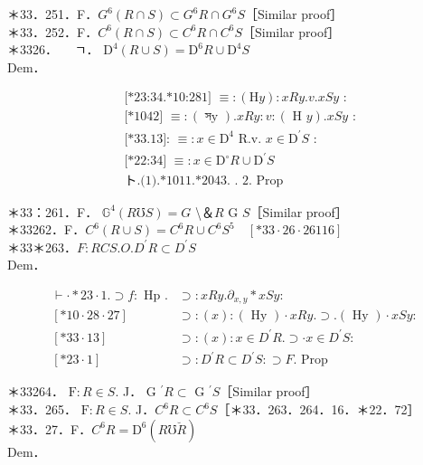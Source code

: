 \documentclass[10pt]{article}
\begin{document}
＊33．251．F．$G^{6}(R \cap S) \subset G^{6} R \cap G^{6} S$［Similar proof］\\
＊33．252．F．$C^{6}(R \cap S) \subset C^{6} R \cap C^{6} S$［Similar proof］\\
＊3326．$\quad$ ㄱ． $\mathrm{D}^{4}(R \cup S)=\mathrm{D}^{6} R \cup \mathrm{D}^{4} S$\\
Dem．


\begin{align*}
& \text { [*23:34.*10:281] } \equiv:(\mathrm{H} y): x R y . v . x S y \text { : } \\
& \text { [*1042] } \equiv:(\text { সy }) . x R y: v:(\text { H } y) . x S y \text { : } \\
& \text { [*33.13]: } \equiv: x \in \mathrm{D}^{4} \text { R.v. } x \in \mathrm{D}^{\prime} S \text { : } \\
& \text { [*22:34] } \equiv: x \in \mathrm{D}^{\circ} R \cup \mathrm{D}^{\prime} S  \tag{1}\\
& \text { ト.(1).*1011.*2043. . } 2 \text {. Prop }
\end{align*}


＊33：261．F． $\mathbb{G}^{4}(R \mho S)=G$ \textbackslash ＆$R$ G $S$［Similar proof］\\
＊33262．F．$C^{6}(R \cup S)=C^{6} R \cup C^{6} S^{5} \quad[* 33 \cdot 26 \cdot 26116]$\\
＊33＊263．$F: R C S . O . D^{\prime} R \subset D^{\prime} S$\\
Dem．

$$
\begin{array}{ll}
\vdash \cdot * 23 \cdot 1 . \supset f: \text { Hp } . & \supset: x R y . \partial_{x, y} * x S y: \\
{[* 10 \cdot 28 \cdot 27]} & \supset:(x):(\text { Hy }) \cdot x R y . \supset .(\text { Hy }) \cdot x S y: \\
{[* 33 \cdot 13]} & \supset:(x): x \in D^{\prime} R . \supset \cdot x \in D^{\prime} S: \\
{[* 23 \cdot 1]} & \supset: D^{\prime} R \subset D^{\prime} S: \supset F . \text { Prop }
\end{array}
$$

＊33264． $\mathrm{F}: R \in S$. J． G $^{\prime} R \subset$ G $^{\prime} S$［Similar proof］\\
＊33．265． $\mathrm{F}: R \in S$. J．$C^{6} R \subset C^{6} S$［＊33．263．264．16．＊22．72］\\
＊33．27．F．$C^{6} R=\mathrm{D}^{6}(R \mho \breve{R})$\\
Dem．
\end{document}
